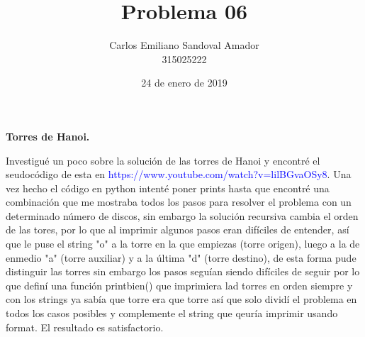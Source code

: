 \documentclass[letterpaper, 12pt, oneside]{article}%
\title{Problema 06}
\author{Carlos Emiliano Sandoval Amador \\ 315025222}
\date{24 de enero de 2019}
\begin{document}
	\maketitle
	\begin{center}
		\textbf{\large Torres de Hanoi.}
	\end{center}
	Investigué un poco sobre la solución de las torres de Hanoi y encontré el seudocódigo de esta en \textcolor{blue}{https://www.youtube.com/watch?v=lilBGvaOSy8}. Una vez hecho el código en python intenté poner prints hasta que encontré una combinación que me mostraba todos los pasos para resolver el problema con un determinado número de discos, sin embargo la solución recursiva cambia el orden de las tores, por lo que al imprimir algunos pasos eran difíciles de entender, así que le puse el string "o" a la torre en la que empiezas (torre origen), luego a la de enmedio "a" (torre auxiliar) y a la última "d" (torre destino), de esta forma pude distinguir las torres sin embargo los pasos seguían siendo difíciles de seguir por lo que definí una función printbien() que imprimiera lad torres en orden siempre y con los strings ya sabía que torre era que torre así que solo dividí el problema en todos los casos posibles y complemente el string que qeuría imprimir usando format. El resultado es satisfactorio.
\end{document}
